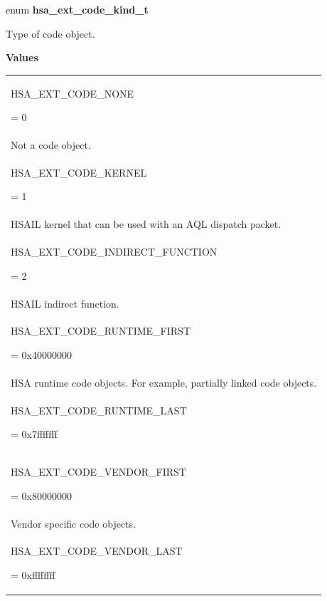 \documentclass[final]{book}
\newcommand{\reftyp}[1]{#1}
\newcommand{\refenu}[1]{\reftyp{#1}}
\begin{document}
\noindent\begin{tcolorbox}[breakable,nobeforeafter,arc=0mm,colframe=white,colback=lightgray,left=0mm]
enum \hypertarget{group__FinalizerCoreApi_1ga3a26aac857ef4f02699a2ed8a4c425e3}{\textbf{hsa_ext_code_kind_t}}
\end{tcolorbox}
Type of code object.

\noindent\textbf{Values}\\[-5mm]
\begin{longtable}{@{\hspace{2em}}p{\linewidth-2em}}
\hspace{-2em}\hypertarget{group__FinalizerCoreApi_1gga3a26aac857ef4f02699a2ed8a4c425e3aa692c691cdb10a56486a1e8d246414e3}{\refenu{HSA_EXT_CODE_NONE}} = 0\\Not a code object.\\[2mm]
\hspace{-2em}\hypertarget{group__FinalizerCoreApi_1gga3a26aac857ef4f02699a2ed8a4c425e3a5c83ef1db7eaa20cdf2612ba26e316cc}{\refenu{HSA_EXT_CODE_KERNEL}} = 1\\HSAIL kernel that can be used with an AQL dispatch packet.\\[2mm]
\hspace{-2em}\hypertarget{group__FinalizerCoreApi_1gga3a26aac857ef4f02699a2ed8a4c425e3a5f810d8ab0aae6b7f5af079857bbb14c}{\refenu{HSA_EXT_CODE_INDIRECT_FUNCTION}} = 2\\HSAIL indirect function.\\[2mm]
\hspace{-2em}\hypertarget{group__FinalizerCoreApi_1gga3a26aac857ef4f02699a2ed8a4c425e3afe329fae97936c684cd1e7df360c7160}{\refenu{HSA_EXT_CODE_RUNTIME_FIRST}} = 0x40000000\\HSA runtime code objects. For example, partially linked code objects.\\[2mm]
\hspace{-2em}\hypertarget{group__FinalizerCoreApi_1gga3a26aac857ef4f02699a2ed8a4c425e3a9c49857996a8d326eabb3080b9e38972}{\refenu{HSA_EXT_CODE_RUNTIME_LAST}} = 0x7fffffff\\[2mm]
\hspace{-2em}\hypertarget{group__FinalizerCoreApi_1gga3a26aac857ef4f02699a2ed8a4c425e3aefd6d814296d049b06ab2de301cd10b1}{\refenu{HSA_EXT_CODE_VENDOR_FIRST}} = 0x80000000\\Vendor specific code objects.\\[2mm]
\hspace{-2em}\hypertarget{group__FinalizerCoreApi_1gga3a26aac857ef4f02699a2ed8a4c425e3accaced1295912da1748d70c5abde593b}{\refenu{HSA_EXT_CODE_VENDOR_LAST}} = 0xffffffff
\end{longtable}
\end{document}
